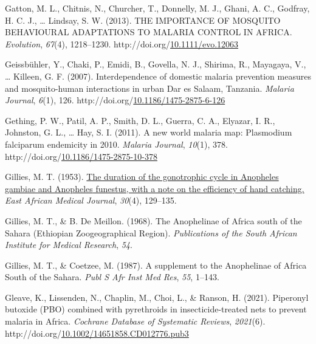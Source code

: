 \documentclass[12pt,twoside]{reedthesis}
\newlength{\cslhangindent}
\newenvironment{CSLReferences}[2] %
 {%
  \setlength{\parindent}{0pt}
  \ifodd #1 \everypar{\setlength{\hangindent}{\cslhangindent}}\ignorespaces\fi
  \ifnum #2 > 0
  \setlength{\parskip}{#2\baselineskip}
  \fi
 }%
 {}
\begin{document}
\begin{CSLReferences}{1}{0}
\leavevmode{}%
Gatton, M. L., Chitnis, N., Churcher, T., Donnelly, M. J., Ghani, A. C., Godfray, H. C. J., \ldots{} Lindsay, S. W. (2013). {THE} {IMPORTANCE} {OF} {MOSQUITO} {BEHAVIOURAL} {ADAPTATIONS} {TO} {MALARIA} {CONTROL} {IN} {AFRICA}. \emph{Evolution}, \emph{67}(4), 1218--1230. http://doi.org/\href{https://doi.org/10.1111/evo.12063}{10.1111/evo.12063}

\leavevmode{}%
Geissbühler, Y., Chaki, P., Emidi, B., Govella, N. J., Shirima, R., Mayagaya, V., \ldots{} Killeen, G. F. (2007). Interdependence of domestic malaria prevention measures and mosquito-human interactions in urban {Dar} es {Salaam}, {Tanzania}. \emph{Malaria Journal}, \emph{6}(1), 126. http://doi.org/\href{https://doi.org/10.1186/1475-2875-6-126}{10.1186/1475-2875-6-126}

\leavevmode{}%
Gething, P. W., Patil, A. P., Smith, D. L., Guerra, C. A., Elyazar, I. R., Johnston, G. L., \ldots{} Hay, S. I. (2011). A new world malaria map: {Plasmodium} falciparum endemicity in 2010. \emph{Malaria Journal}, \emph{10}(1), 378. http://doi.org/\href{https://doi.org/10.1186/1475-2875-10-378}{10.1186/1475-2875-10-378}

\leavevmode{}%
Gillies, M. T. (1953). \href{https://www.ncbi.nlm.nih.gov/pubmed/13060242}{The duration of the gonotrophic cycle in {Anopheles} gambiae and {Anopheles} funestus, with a note on the efficiency of hand catching.} \emph{East African Medical Journal}, \emph{30}(4), 129--135.

\leavevmode{}%
Gillies, M. T., \& B. De Meillon. (1968). The {Anophelinae} of {Africa} south of the {Sahara} ({Ethiopian} {Zoogeographical} {Region}). \emph{Publications of the South African Institute for Medical Research}, \emph{54}.

\leavevmode{}%
Gillies, M. T., \& Coetzee, M. (1987). A supplement to the {Anophelinae} of {Africa} {South} of the {Sahara}. \emph{Publ S Afr Inst Med Res}, \emph{55}, 1--143.

\leavevmode{}%
Gleave, K., Lissenden, N., Chaplin, M., Choi, L., \& Ranson, H. (2021). Piperonyl butoxide ({PBO}) combined with pyrethroids in insecticide-treated nets to prevent malaria in {Africa}. \emph{Cochrane Database of Systematic Reviews}, \emph{2021}(6). http://doi.org/\href{https://doi.org/10.1002/14651858.CD012776.pub3}{10.1002/14651858.CD012776.pub3}


\end{CSLReferences}
\end{document}
